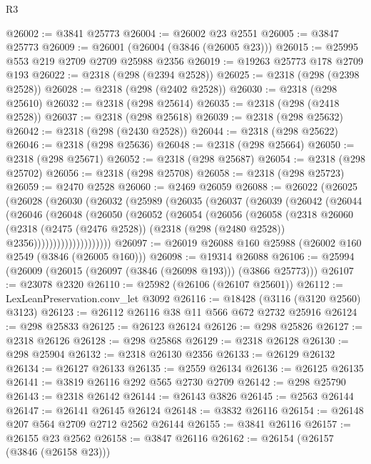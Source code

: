 \begin{lexlean}{R3}
\begin{coremodule}
@26002 := @3841 @25773
@26004 := @26002 @23 @2551
@26005 := @3847 @25773
@26009 := @26001 (@26004 (@3846 (@26005 @23)))
@26015 := @25995 @553 @219 @2709 @2709 @25988 @2356
@26019 := @19263 @25773 @178 @2709 @193
@26022 := @2318 (@298 (@2394 @2528))
@26025 := @2318 (@298 (@2398 @2528))
@26028 := @2318 (@298 (@2402 @2528))
@26030 := @2318 (@298 @25610)
@26032 := @2318 (@298 @25614)
@26035 := @2318 (@298 (@2418 @2528))
@26037 := @2318 (@298 @25618)
@26039 := @2318 (@298 @25632)
@26042 := @2318 (@298 (@2430 @2528))
@26044 := @2318 (@298 @25622)
@26046 := @2318 (@298 @25636)
@26048 := @2318 (@298 @25664)
@26050 := @2318 (@298 @25671)
@26052 := @2318 (@298 @25687)
@26054 := @2318 (@298 @25702)
@26056 := @2318 (@298 @25708)
@26058 := @2318 (@298 @25723)
@26059 := @2470 @2528
@26060 := @2469 @26059
@26088 := @26022
    (@26025
      (@26028
        (@26030
          (@26032
            (@25989
              (@26035
                (@26037
                  (@26039
                    (@26042
                      (@26044
                        (@26046
                          (@26048
                            (@26050
                              (@26052
                                (@26054
                                  (@26056
                                    (@26058
                                      (@2318
                                        @26060
                                        (@2318
                                          (@2475 (@2476 @2528))
                                          (@2318 (@298 (@2480 @2528)) @2356))))))))))))))))))))
@26097 := @26019 @26088 @160 @25988 (@26002 @160 @2549 (@3846 (@26005 @160)))
@26098 := @19314 @26088
@26106 := @25994 (@26009 (@26015 (@26097 (@3846 (@26098 @193))) (@3866 @25773)))
@26107 := @23078 @2320
@26110 := @25982 (@26106 (@26107 @25601))
@26112 := LexLeanPreservation.conv_let @3092
@26116 := @18428 (@3116 (@3120 @2560) @3123)
@26123 := @26112 @26116 @38 @11 @566 @672 @2732 @25916
@26124 := @298 @25833
@26125 := @26123 @26124
@26126 := @298 @25826
@26127 := @2318 @26126
@26128 := @298 @25868
@26129 := @2318 @26128
@26130 := @298 @25904
@26132 := @2318 @26130 @2356
@26133 := @26129 @26132
@26134 := @26127 @26133
@26135 := @2559 @26134
@26136 := @26125 @26135
@26141 := @3819 @26116 @292 @565 @2730 @2709
@26142 := @298 @25790
@26143 := @2318 @26142
@26144 := @26143 @3826
@26145 := @2563 @26144
@26147 := @26141 @26145 @26124
@26148 := @3832 @26116
@26154 := @26148 @207 @564 @2709 @2712 @2562 @26144
@26155 := @3841 @26116
@26157 := @26155 @23 @2562
@26158 := @3847 @26116
@26162 := @26154 (@26157 (@3846 (@26158 @23)))

\end{coremodule}
\end{lexlean}
